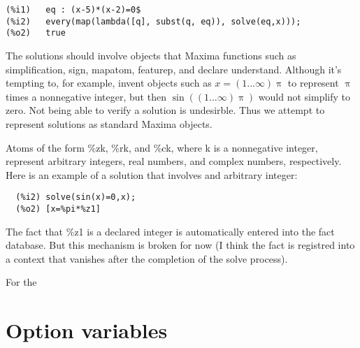 \documentclass[]{scrartcl}
\begin{document}
\begin{verbatim}
(%i1)	eq : (x-5)*(x-2)=0$
(%i2)	every(map(lambda([q], subst(q, eq)), solve(eq,x)));
(%o2)	true
\end{verbatim}

The solutions should involve objects that Maxima functions such as simplification, sign, mapatom, featurep,
and declare understand. Although it's tempting to, for example, invent objects such as
\(x = (1 ... \infty) \uppi\) to represent \(\uppi\) times a nonnegative integer, but then
\(\sin \left ((1 ... \infty) \uppi \right) \) would not simplify to zero. Not being able to verify a
solution is undesirble. Thus we attempt to represent solutions as standard Maxima objects.

Atoms of the form \%zk, \%rk, and \%ck, where k is a nonnegative integer, represent arbitrary integers, real numbers, and complex numbers, respectively. Here is an example of a solution that involves and arbitrary integer:
\begin{verbatim}
  (%i2)	solve(sin(x)=0,x);
  (%o2)	[x=%pi*%z1]
\end{verbatim}
The fact that \%z1 is a declared integer is automatically entered into the fact database. But this mechanism is broken for now (I think the fact is registred into a context that vanishes after the completion of the solve process).

For the


\section{Option variables}
\end{document}
